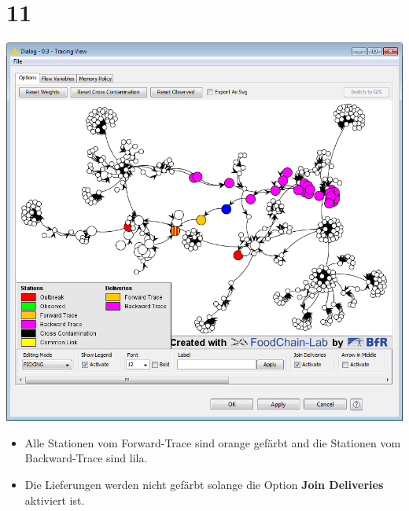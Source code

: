 \documentclass{beamer}
\begin{document}
\section{11}
\begin{frame}
	\begin{center}
  		\includegraphics[height=0.6\textheight]{11.png}
	\end{center}
	\begin{itemize}
		\item Alle Stationen vom Forward-Trace sind orange gefärbt and die Stationen vom Backward-Trace sind lila.
		\item Die Lieferungen werden nicht gefärbt solange die Option \textbf{Join Deliveries} aktiviert ist.
	\end{itemize}
\end{frame}
\end{document}
